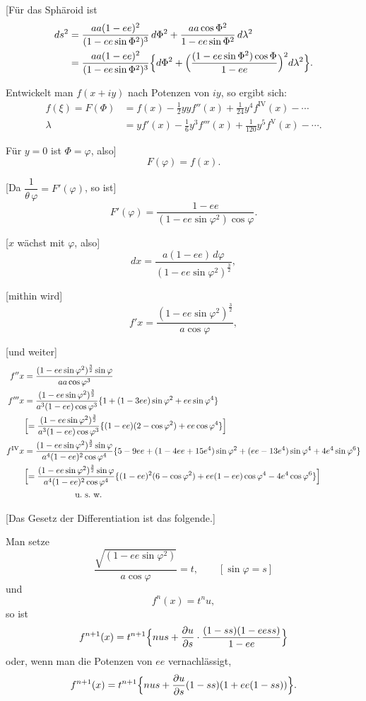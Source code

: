 \documentclass[12pt,a4paper]{article}
\begin{document}
[Für das Sphäroid ist
\begin{align*}
ds^2 &= \frac{aa(1-ee)^2}{(1-ee\sin\Phi^2)^3}\,d\Phi^2 + \frac{aa\cos\Phi^2}{1-ee\sin\Phi^2}\,d\lambda^2\\
&= \frac{aa(1-ee)^2}{(1-ee\sin\Phi^2)^3}\Bigl\{d\Phi^2 + \Bigl(\frac{(1-ee\sin\Phi^2)\cos\Phi}{1-ee}\Bigr)^2 d\lambda^2\Bigr\}.
\end{align*}

Entwickelt man $f(x+iy)$ nach Potenzen von $iy$, so ergibt sich:
\begin{align*}
f(\xi) = F(\Phi) &= f(x) - \tfrac{1}{2}yyf''(x) + \tfrac{1}{24}y^4f^{\mathrm{IV}}(x) - \cdots\\
\lambda &= yf'(x) - \tfrac{1}{6}y^3f'''(x) + \tfrac{1}{120}y^5f^{\mathrm{V}}(x) - \cdots.
\end{align*}

Für $y=0$ ist $\Phi = \varphi$, also]
\[
F(\varphi) = f(x).
\]

[Da $\dfrac{1}{\theta\,\varphi} = F'(\varphi)$, so ist]
\[
F'(\varphi) = \frac{1-ee}{(1-ee\sin\varphi^2)\cos\varphi}.
\]

[$x$ wächst mit $\varphi$, also]
\[
dx = \frac{a(1-ee)\,d\varphi}{(1-ee\sin\varphi^2)^{\frac{3}{2}}},
\]

[mithin wird]
\[
f'x = \frac{(1-ee\sin\varphi^2)^{\frac{3}{2}}}{a\cos\varphi},
\]

[und weiter]
\begin{align*}
f''x &= \frac{(1-ee\sin\varphi^2)^{\frac{3}{2}}\sin\varphi}{aa\cos\varphi^3}\\
f'''x &= \frac{(1-ee\sin\varphi^2)^{\frac{3}{2}}}{a^3(1-ee)\cos\varphi^3}\{1+(1-3ee)\sin\varphi^2 + ee\sin\varphi^4\}\\
&\Bigl[= \frac{(1-ee\sin\varphi^2)^{\frac{3}{2}}}{a^3(1-ee)\cos\varphi^3}\{(1-ee)(2-\cos\varphi^2) + ee\cos\varphi^4\}\Bigr]\\
f^{\mathrm{IV}}x &= \frac{(1-ee\sin\varphi^2)^{\frac{3}{2}}\sin\varphi}{a^4(1-ee)^2\cos\varphi^4}\{5-9ee+(1-4ee+15e^4)\sin\varphi^2 + (ee-13e^4)\sin\varphi^4 + 4e^4\sin\varphi^6\}\\
&\Bigl[= \frac{(1-ee\sin\varphi^2)^{\frac{3}{2}}\sin\varphi}{a^4(1-ee)^2\cos\varphi^4}\{(1-ee)^2(6-\cos\varphi^2) + ee(1-ee)\cos\varphi^4 - 4e^4\cos\varphi^6\}\Bigr]\\
&\qquad\qquad\qquad\text{u.~s.~w.}
\end{align*}

[Das Gesetz der Differentiation ist das folgende.]

Man setze
\[
\frac{\sqrt{(1-ee\sin\varphi^2)}}{a\cos\varphi} = t,\qquad [\sin\varphi = s]
\]
und
\[
f^n(x) = t^n u,
\]
so ist
\[
f^{n+1}(x) = t^{n+1}\Bigl\{nus + \frac{\partial u}{\partial s}\cdot\frac{(1-ss)(1-ee ss)}{1-ee}\Bigr\}
\]
oder, wenn man die Potenzen von $ee$ vernachlässigt,
\[
f^{n+1}(x) = t^{n+1}\Bigl\{nus + \frac{\partial u}{\partial s}(1-ss)(1+ee(1-ss))\Bigr\}.
\]
\end{document}
